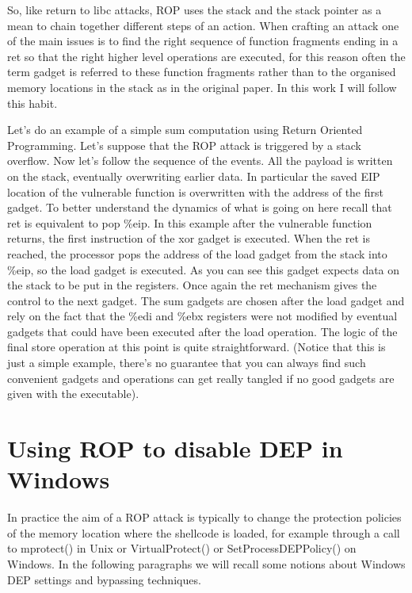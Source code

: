 \documentclass[Lau,binding=0.6cm]{sapthesis}
\begin{document}
So, like return to libc attacks, ROP uses the stack and the stack pointer as a mean to chain together different steps of an action.
When crafting an attack one of the main issues is to find the right sequence of function fragments ending in a ret so that the right higher level operations are executed, for this reason often the term gadget is referred to these function fragments rather than to the organised memory locations in the stack as in the original paper. In this work I will follow this habit.
  

Let’s do an example of a simple sum computation using Return Oriented Programming.
Let’s suppose that the ROP attack is triggered by a stack overflow. Now let’s follow the sequence of the events. All the payload is written on the stack, eventually overwriting earlier data. In particular the saved EIP location of the vulnerable function is overwritten with the address of the first gadget. 
To better understand the dynamics of what is going on here recall that ret is equivalent to pop \%eip. In this example after the vulnerable function returns, the first instruction of the xor gadget is executed. When the ret is reached, the processor pops the address of the load gadget from the stack into \%eip, so the load gadget is executed.
As you can see this gadget expects data on the stack to be put in the registers. Once again the ret mechanism gives the control to the next gadget. The sum gadgets are chosen after the load gadget and rely on the fact that the \%edi and \%ebx registers were not modified by eventual gadgets that could have been executed after the load operation. The logic of the final store operation at this point is quite straightforward. (Notice that this is just a simple example, there’s no guarantee that you can always find such convenient gadgets and operations can get really tangled if no good gadgets are given with the executable).


\section{Using ROP to disable DEP in Windows}

In practice the aim of a ROP attack is typically to change the protection policies of the memory location where the shellcode is loaded, for example through a call to mprotect() in Unix or VirtualProtect() or SetProcessDEPPolicy() on Windows. In the following paragraphs we will recall some notions about Windows DEP settings and bypassing techniques.
\end{document}
